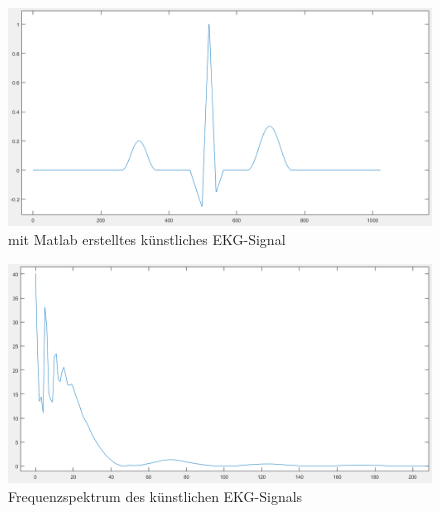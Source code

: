 \begin{figure} [!h]
	\includegraphics[width=\textwidth] {EKG_Signal.png}
	\caption{mit Matlab erstelltes künstliches EKG-Signal}
	\label{Matlab EKG-Signal} 
\end{figure}

\begin{figure} [!h]
	\includegraphics[width=\textwidth] {EKG_diskretes_Frequenzspektrum_Ausschnitt.png}
	\caption{Frequenzspektrum des künstlichen EKG-Signals}
	\label{Matlab Frequenzspektrum} 
\end{figure}


